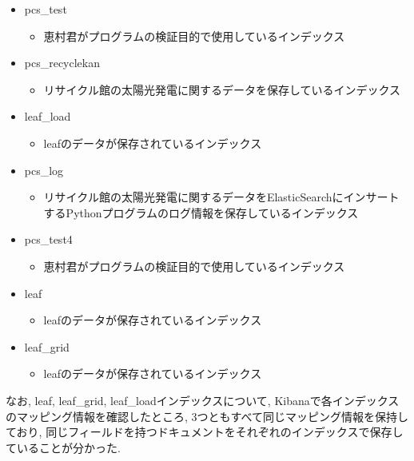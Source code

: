 \begin{itemize}
    \item pcs\_test
          \begin{itemize}
              \item 恵村君がプログラムの検証目的で使用しているインデックス
          \end{itemize}
    \item pcs\_recyclekan
          \begin{itemize}
              \item リサイクル館の太陽光発電に関するデータを保存しているインデックス
          \end{itemize}
    \item leaf\_load
          \begin{itemize}
              \item leafのデータが保存されているインデックス
          \end{itemize}
    \item pcs\_log
          \begin{itemize}
              \item リサイクル館の太陽光発電に関するデータをElasticSearchにインサートするPythonプログラムのログ情報を保存しているインデックス
          \end{itemize}
    \item pcs\_test4
          \begin{itemize}
              \item 恵村君がプログラムの検証目的で使用しているインデックス
          \end{itemize}
    \item leaf
          \begin{itemize}
              \item leafのデータが保存されているインデックス
          \end{itemize}
    \item leaf\_grid
          \begin{itemize}
              \item leafのデータが保存されているインデックス
          \end{itemize}
\end{itemize}

なお, leaf, leaf\_grid, leaf\_loadインデックスについて, Kibanaで各インデックスのマッピング情報を確認したところ, 3つともすべて同じマッピング情報を保持しており, 同じフィールドを持つドキュメントをそれぞれのインデックスで保存していることが分かった.

